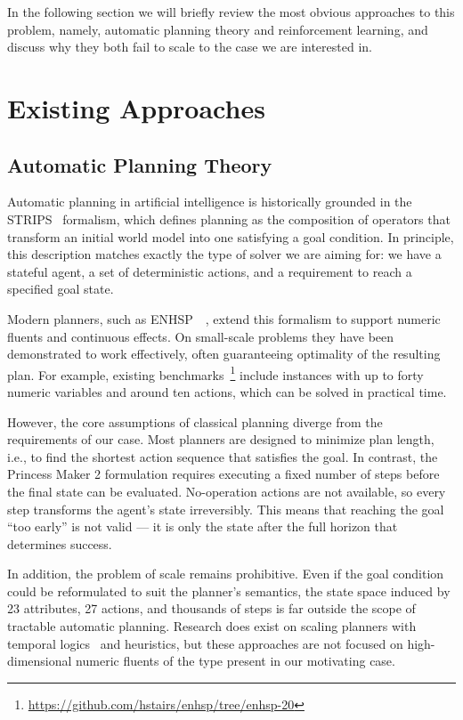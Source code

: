 \documentclass[12pt, a4paper]{report}
\begin{document}
	In the following section we will briefly review the most obvious approaches to this problem, namely, automatic planning theory and reinforcement learning, and discuss why they both fail to scale to the case we are interested in.
	
	\section{Existing Approaches}\label{section::existing-approaches}
	
	\subsection{Automatic Planning Theory}
	
	Automatic planning in artificial intelligence is historically grounded in the STRIPS~\cite{fikes1971strips} formalism, which defines planning as the composition of operators that transform an initial world model into one satisfying a goal condition.
	In principle, this description matches exactly the type of solver we are aiming for: we have a stateful agent, a set of deterministic actions, and a requirement to reach a specified goal state.
	
	Modern planners, such as ENHSP~\cite{enhsp::scala2020subgoaling}~\cite{enhsp::Scala2016IntervalBasedRF}, extend this formalism to support numeric fluents and continuous effects. 
	On small-scale problems they have been demonstrated to work effectively, often guaranteeing optimality of the resulting plan.
	For example, existing benchmarks~\footnote{\url{https://github.com/hstairs/enhsp/tree/enhsp-20}} include instances with up to forty numeric variables and around ten actions, which can be solved in practical time.
	
	However, the core assumptions of classical planning diverge from the requirements of our case.
	Most planners are designed to minimize plan length, i.e., to find the shortest action sequence that satisfies the goal.
	In contrast, the Princess Maker 2 formulation requires executing a fixed number of steps before the final state can be evaluated.
	No-operation actions are not available, so every step transforms the agent’s state irreversibly.
	This means that reaching the goal “too early” is not valid — it is only the state after the full horizon that determines success.
	
	In addition, the problem of scale remains prohibitive.
	Even if the goal condition could be reformulated to suit the planner’s semantics, the state space induced by 23 attributes, 27 actions, and thousands of steps is far outside the scope of tractable automatic planning.
	Research does exist on scaling planners with temporal logics~\cite{LU2025121666} and heuristics, but these approaches are not focused on high-dimensional numeric fluents of the type present in our motivating case.
	
\end{document}
